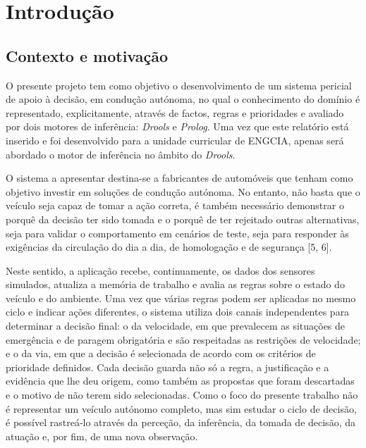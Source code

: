 
\chapter{Introdução}\label{sec:1}

\section{Contexto e motivação}\label{sec:1.1}

O presente projeto tem como objetivo o desenvolvimento de um sistema pericial de apoio à decisão, em condução autónoma, no qual o conhecimento do domínio é representado, explicitamente, através de factos, regras e prioridades e avaliado por dois motores de inferência: \emph{Drools }e \emph{Prolog}. Uma vez que este relatório está inserido e foi desenvolvido para a unidade curricular de ENGCIA, apenas será abordado o motor de inferência no âmbito do \emph{Drools}.

O sistema a apresentar destina-se a fabricantes de automóveis que tenham como objetivo investir em soluções de condução autónoma. No entanto, não basta que o veículo seja capaz de tomar a ação correta, é também necessário demonstrar o porquê da decisão ter sido tomada e o porquê de ter rejeitado outras alternativas, seja para validar o comportamento em cenários de teste, seja para responder às exigências da circulação do dia a dia, de homologação e de segurança [5, 6].

Neste sentido, a aplicação recebe, continuamente, os dados dos sensores simulados, atualiza a memória de trabalho e avalia as regras sobre o estado do veículo e do ambiente. Uma vez que várias regras podem ser aplicadas no mesmo ciclo e indicar ações diferentes, o sistema utiliza dois canais independentes para determinar a decisão final: o da velocidade, em que prevalecem as situações de emergência e de paragem obrigatória e são respeitadas as restrições de velocidade; e o da via, em que a decisão é selecionada de acordo com os critérios de prioridade definidos. Cada decisão guarda não só a regra, a justificação e a evidência que lhe deu origem, como também as propostas que foram descartadas e o motivo de não terem sido selecionadas. Como o foco do presente trabalho não é representar um veículo autónomo completo, mas sim estudar o ciclo de decisão, é possível rastreá-lo através da perceção, da inferência, da tomada de decisão, da atuação e, por fim, de uma nova observação.

